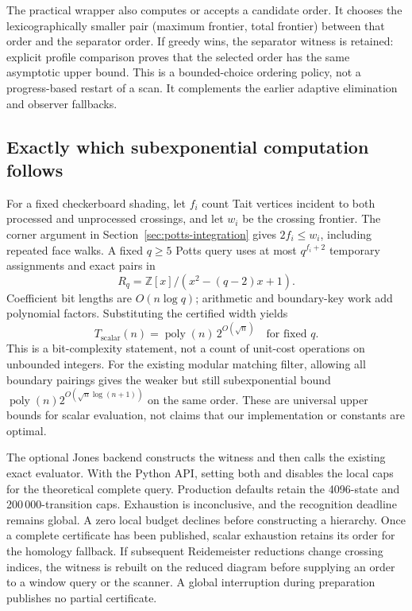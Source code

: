 The practical wrapper also computes or accepts a candidate order.  It
chooses the lexicographically smaller pair (maximum frontier, total frontier)
between that order and the separator order.  If greedy wins, the separator
witness is retained: explicit profile comparison proves that the selected
order has the same asymptotic upper bound.  This is a bounded-choice ordering
policy, not a progress-based restart of a scan.  It complements the earlier
adaptive elimination and observer fallbacks.

\subsection{Exactly which subexponential computation follows}

For a fixed checkerboard shading, let $f_i$ count Tait vertices incident to
both processed and unprocessed crossings, and let $w_i$ be the crossing
frontier.  The corner argument in Section~\ref{sec:potts-integration} gives
$2f_i\le w_i$, including repeated face walks.  A fixed $q\ge5$ Potts query
uses at most $q^{f_i+2}$ temporary assignments and exact pairs in
\[
 R_q=\mathbb Z[x]/(x^2-(q-2)x+1).
\]
Coefficient bit lengths are $O(n\log q)$; arithmetic and boundary-key work
add polynomial factors.  Substituting the certified width yields
\[
 T_{\mathrm{scalar}}(n)=\operatorname{poly}(n)\,2^{O(\sqrt n)}
 \quad\text{for fixed }q.
\]
This is a bit-complexity statement, not a count of unit-cost operations on
unbounded integers.  For the existing modular matching filter, allowing all
boundary pairings gives the weaker but still subexponential bound
$\operatorname{poly}(n)2^{O(\sqrt n\log(n+1))}$ on the same order.
These are universal upper bounds for scalar evaluation, not claims that
our implementation or constants are optimal.

The optional  Jones backend constructs the witness and
then calls the existing exact evaluator.  With the Python API, setting both
 and  disables the local
caps for the theoretical complete query.  Production defaults retain the
4096-state and 200\,000-transition caps.  Exhaustion is inconclusive, and
the recognition deadline remains global.  A zero local budget declines
before constructing a hierarchy.  Once a complete certificate has been
published, scalar exhaustion retains its order for the homology fallback.
If subsequent Reidemeister reductions change crossing indices, the witness
is rebuilt on the reduced diagram before supplying an order to a window
query or the scanner.  A global interruption during preparation publishes
no partial certificate.

